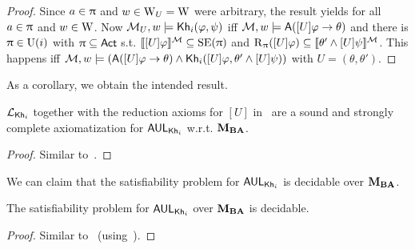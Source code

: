\begin{proof}
	Since $a \in \uppi$ and $w \in \operatorname{W}_{{U}} = \operatorname{W}$ were arbitrary, the result yields for all $a \in \uppi$ and $w \in \operatorname{W}$.
	Now $\mathcal{M}_{{U}},w \models {\sf Kh}_i(\varphi,\psi)$ iff $\mathcal{M},w \models {\sf A}([U]\varphi \rightarrow \theta)$ and there is $\uppi \in \operatorname{U}(i)$ with $\uppi \subseteq {\rm \sf Act}$ s.t. $\llbracket [U]\varphi \rrbracket^{\mathcal{M}} \subseteq \operatorname{SE}(\uppi)$ and $\operatorname{R}_\uppi([U]\varphi) \subseteq \llbracket \theta' \wedge [U]\psi \rrbracket^{\mathcal{M}}$.
	This happens iff $\mathcal{M},w \models ({\sf A}([U]\varphi \rightarrow \theta) \wedge {\sf Kh}_i([U]\varphi,\theta' \wedge [U]\psi))$ with $U = (\theta,\theta')$.
\end{proof}

As a corollary, we obtain the intended result.

\medskip 

\begin{theorem}\label{th:aulcomplete}
$\mathcal{L}_{{\sf Kh}_i}$ together with the reduction axioms for $[U]$ in~ are a sound and strongly complete axiomatization for $\mathsf{AUL}_{{\sf Kh}_i}$ w.r.t. $\mathbf{M}_{\mathbf{BA}}$.
\end{theorem}

\begin{proof}
Similar to~.
\end{proof}

We can claim that the satisfiability problem for $\mathsf{AUL}_{{\sf Kh}_i}$ is decidable over $\mathbf{M}_{\mathbf{BA}}$.

\medskip 

\begin{corollary}\label{cor:aulsat}
The satisfiability problem for $\mathsf{AUL}_{{\sf Kh}_i}$ over $\mathbf{M}_{\mathbf{BA}}$ is decidable.
\end{corollary}
\begin{proof}
Similar to~ (using~).
\end{proof}
